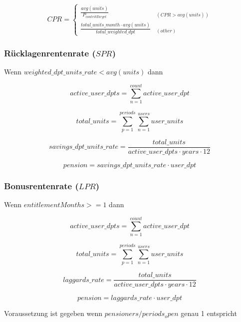 \begin{equation}
CPR = \begin{cases} 
	\frac{avg(units)}{P_{contribTarget}} & _{(CPR > avg(units))} \\
	\frac{total\_units\_month  \cdot avg(units)} 
		{total\_weighted\_dpt} & _{(other)}
\end{cases}
\end{equation}





\subsubsection*{Rücklagenrentenrate ($SPR$)}

Wenn $weighted\_dpt\_units\_rate < avg(units)$ dann 

\begin{equation}
	active\_user\_dpts = 
	\sum_{n=1}^{count} active\_user\_dpt
\end{equation}

\begin{equation}
	total\_units = 	
	\sum_{p=1}^{periods} \sum_{n=1}^{users} user\_units	
\end{equation}

\begin{equation}
	savings\_dpt\_units\_rate = 	
	\frac{total\_units} 
	{active\_user\_dpts \cdot years \cdot 12}		
\end{equation}

\begin{equation}
	pension = savings\_dpt\_units\_rate \cdot user\_dpt
\end{equation}


\subsubsection*{Bonusrentenrate ($LPR$)}

Wenn $entitlementMonths >= 1$ dann 

\begin{equation*}
	active\_user\_dpts = 
	\sum_{n=1}^{count} active\_user\_dpt
\end{equation*}

\begin{equation*}
	total\_units = 	
	\sum_{p=1}^{periods} \sum_{n=1}^{users} user\_units	
\end{equation*}

\begin{equation*}
	laggards\_rate = 	
	\frac{total\_units} 
	{active\_user\_dpts \cdot years \cdot 12}		
\end{equation*}

\begin{equation*}
	pension = laggards\_rate \cdot user\_dpt
\end{equation*}


Voraussetzung ist gegeben wenn $pensioners / periods_open$ genau 1 entspricht